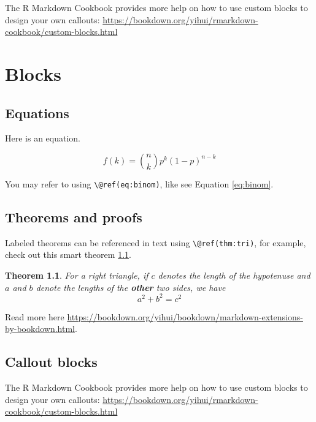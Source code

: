\documentclass[
  10pt,
  b5paper,
  oneside]{book}
\newtheorem{theorem}{Theorem}[chapter]
\theoremstyle{definition}
\theoremstyle{definition}
\theoremstyle{definition}
\theoremstyle{definition}
\theoremstyle{remark}
\begin{document}
The R Markdown Cookbook provides more help on how to use custom blocks to design your own callouts: \url{https://bookdown.org/yihui/rmarkdown-cookbook/custom-blocks.html}

\hypertarget{blocks-2}{%
\chapter{Blocks}\label{blocks-2}}

\hypertarget{equations-2}{%
\section{Equations}\label{equations-2}}

Here is an equation.

\begin{equation} 
  f\left(k\right) = \binom{n}{k} p^k\left(1-p\right)^{n-k}
  \label{eq:binom}
\end{equation}

You may refer to using \texttt{\textbackslash{}@ref(eq:binom)}, like see Equation \eqref{eq:binom}.

\hypertarget{theorems-and-proofs-2}{%
\section{Theorems and proofs}\label{theorems-and-proofs-2}}

Labeled theorems can be referenced in text using \texttt{\textbackslash{}@ref(thm:tri)}, for example, check out this smart theorem \ref{thm:tri}.

\begin{theorem}
\protect\hypertarget{thm:tri}{}\label{thm:tri}For a right triangle, if \(c\) denotes the \emph{length} of the hypotenuse
and \(a\) and \(b\) denote the lengths of the \textbf{other} two sides, we have
\[a^2 + b^2 = c^2\]
\end{theorem}

Read more here \url{https://bookdown.org/yihui/bookdown/markdown-extensions-by-bookdown.html}.

\hypertarget{callout-blocks-2}{%
\section{Callout blocks}\label{callout-blocks-2}}

The R Markdown Cookbook provides more help on how to use custom blocks to design your own callouts: \url{https://bookdown.org/yihui/rmarkdown-cookbook/custom-blocks.html}
\end{document}
